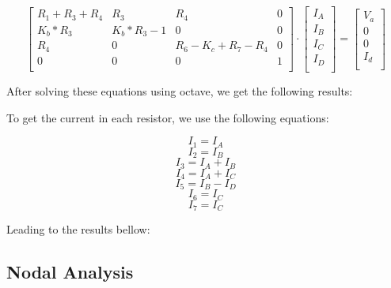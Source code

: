 \[
\begin{bmatrix}
R_1 + R_3 + R_4 & R_3 & R_4 & 0\\
K_b * R_3 & K_b * R_3 - 1 & 0 & 0\\
R_4 & 0 & R_6 - K_c + R_7 - R_4 & 0\\
0 & 0 & 0 & 1\\
\end{bmatrix}
\cdot
\begin{bmatrix}
I_A\\
I_B\\
I_C\\
I_D\\
\end{bmatrix}
=
\begin{bmatrix}
V_a\\
0\\
0\\
I_d\\
\end{bmatrix}
\]

\vspace{0.5cm}

After solving these equations using octave, we get 
the following results:

\vspace{0.5cm}


To get the current in each resistor, we use the following equations:

\vspace{0.5cm}

$$ I_1 = I_A $$
$$ I_2 = I_B $$
$$ I_3 = I_A + I_B $$
$$ I_4 = I_A + I_C $$
$$ I_5 = I_B - I_D $$
$$ I_6 = I_C $$
$$ I_7 = I_C $$

\vspace{0.5cm}

Leading to the results bellow:

\vspace{0.5cm}


\vspace{1.0cm}

\subsection{Nodal Analysis}

\vspace{0.5cm}

